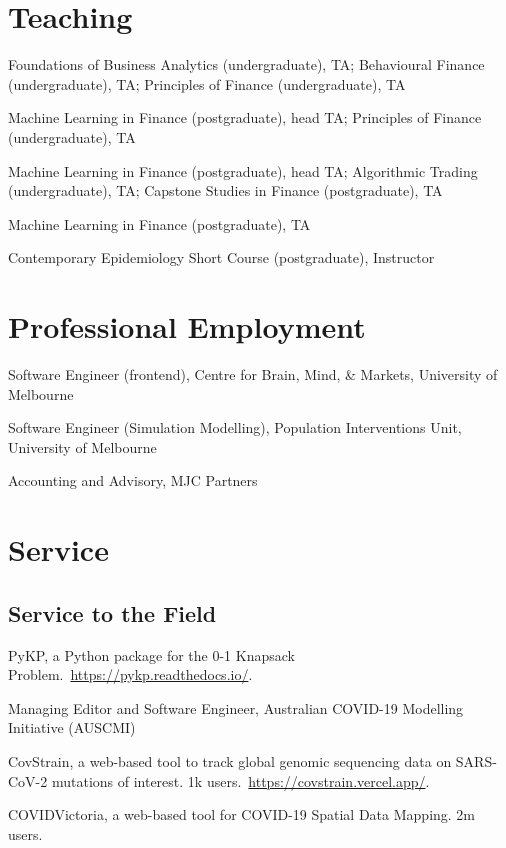 \documentclass[11pt,letterpaper]{report}
\begin{document}
    \section*{Teaching}


    \begin{tablist}
        \item[2026] \tab{}Foundations of Business Analytics (undergraduate), TA; Behavioural Finance (undergraduate), TA; Principles of Finance (undergraduate), TA
        \item[2025] \tab{}Machine Learning in Finance (postgraduate), head TA; Principles of Finance (undergraduate), TA
        \item[2024] \tab{}Machine Learning in Finance (postgraduate), head TA; Algorithmic Trading (undergraduate), TA; Capstone Studies in Finance (postgraduate), TA
        \item[2023] \tab{}Machine Learning in Finance (postgraduate), TA
        \item[2021] \tab{}Contemporary Epidemiology Short Course (postgraduate), Instructor
    \end{tablist}

    \section*{Professional Employment}

    \begin{tablist}
        \item[2025--] \tab{}Software Engineer (frontend), Centre for Brain, Mind, \& Markets, University of Melbourne
        \item[2020--23] \tab{}Software Engineer (Simulation Modelling), Population Interventions Unit, University of Melbourne
        \item[2019--20] \tab{}Accounting and Advisory, MJC Partners
    \end{tablist}

    \section*{Service}

    \subsection*{Service to the Field}
    \begin{tablist}
        \item[2025] \tab{}PyKP, a Python package for the 0-1 Knapsack Problem.\ \url{https://pykp.readthedocs.io/}.
        \item[2023--24] \tab{}Managing Editor and Software Engineer, Australian COVID-19 Modelling Initiative (AUSCMI)
        \item[2022] \tab{}CovStrain, a web-based tool to track global genomic sequencing data on SARS-CoV-2 mutations of interest. 1k users.\ \url{https://covstrain.vercel.app/}.
        \item[2020] \tab{}COVIDVictoria, a web-based tool for COVID-19 Spatial Data Mapping. 2m users.
    \end{tablist}
\end{document}
